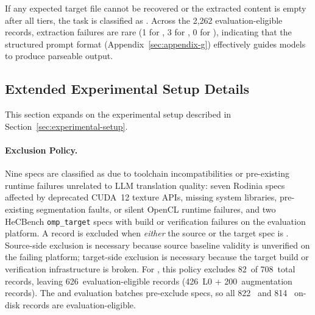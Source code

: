 If any expected target file cannot be recovered or the extracted content is empty after all tiers, the task is classified as \extractionfail{}. Across the 2{,}262 evaluation-eligible records, extraction failures are rare (1 for \qwenshort{}, 3 for \gptnew{}, 0 for \codex{}), indicating that the structured prompt format (Appendix~\ref{sec:appendix-g}) effectively guides models to produce parseable output.

\subsection{Extended Experimental Setup Details}
\label{sec:appendix-a-extended}

This section expands on the experimental setup described in Section~\ref{sec:experimental-setup}.

\paragraph{\knownfail{} Exclusion Policy.} Nine specs are classified as \knownfail{} due to toolchain incompatibilities or pre-existing runtime failures unrelated to LLM translation quality: seven Rodinia specs affected by deprecated CUDA~12 texture APIs, missing system libraries, pre-existing segmentation faults, or silent OpenCL runtime failures, and two HeCBench \texttt{omp\_target} specs with build or verification failures on the evaluation platform.
A record is excluded when \emph{either} the source or the target spec is \knownfail{}. Source-side exclusion is necessary because source baseline validity is unverified on the failing platform; target-side exclusion is necessary because the target build or verification infrastructure is broken. For \qwenshort{}, this policy excludes 82~of 708~total records, leaving 626~evaluation-eligible records (426~L0 + 200~augmentation records). The \gptnew{} and \codex{} evaluation batches pre-exclude \knownfail{} specs, so all 822~\gptnew{} and 814~\codex{} on-disk records are evaluation-eligible.

